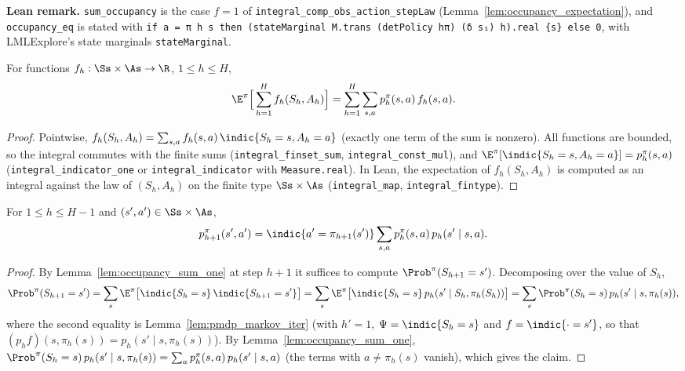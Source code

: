 \textbf{Lean remark.} \texttt{sum\_occupancy} is the case $f = 1$ of
\texttt{integral\_comp\_obs\_action\_stepLaw} (Lemma~\ref{lem:occupancy_expectation}), and
\texttt{occupancy\_eq} is stated with \texttt{if a = π h s then (stateMarginal M.trans (detPolicy hπ) (δ s₁) h).real \{s\} else 0},
with LMLExplore's state marginals \texttt{stateMarginal}.

\begin{lemma}\label{lem:occupancy_expectation}
\leanok
{}
For functions $f_h : \Ss \times \As \to \R$, $1 \le h \le H$,
\[
  \E^\pi\Big[\sum_{h=1}^H f_h(S_h, A_h)\Big] = \sum_{h=1}^H\sum_{s,a} p^\pi_h(s,a)\, f_h(s,a) .
\]
\end{lemma}

\begin{proof}
\leanok
Pointwise, $f_h(S_h, A_h) = \sum_{s,a} f_h(s,a)\,\indic\{S_h = s, A_h = a\}$ (exactly one term
of the sum is nonzero). All functions are bounded, so the integral commutes with the finite
sums (\texttt{integral\_finset\_sum}, \texttt{integral\_const\_mul}), and
$\E^\pi[\indic\{S_h = s, A_h = a\}] = p^\pi_h(s,a)$ (\texttt{integral\_indicator\_one} or
\texttt{integral\_indicator} with \texttt{Measure.real}). In Lean, the expectation of
$f_h(S_h, A_h)$ is computed as an integral against the law of $(S_h, A_h)$ on the finite type
$\Ss \times \As$ (\texttt{integral\_map}, \texttt{integral\_fintype}).
\end{proof}

\begin{lemma}\label{lem:occupancy_recursion}
\leanok
{}
For $1 \le h \le H - 1$ and $(s', a') \in \Ss \times \As$,
\[
  p^\pi_{h+1}(s', a') = \indic\{a' = \pi_{h+1}(s')\}\sum_{s,a} p^\pi_h(s,a)\, p_h(s' \mid s, a) .
\]
\end{lemma}

\begin{proof}
\leanok
By Lemma~\ref{lem:occupancy_sum_one} at step $h + 1$ it suffices to compute
$\Prob^\pi(S_{h+1} = s')$. Decomposing over the value of $S_h$,
\[
  \Prob^\pi(S_{h+1} = s') = \sum_{s}\E^\pi\big[\indic\{S_h = s\}\,\indic\{S_{h+1} = s'\}\big]
  = \sum_{s}\E^\pi\big[\indic\{S_h = s\}\,p_h(s' \mid S_h, \pi_h(S_h))\big]
  = \sum_{s}\Prob^\pi(S_h = s)\,p_h(s' \mid s, \pi_h(s)) ,
\]
where the second equality is Lemma~\ref{lem:pmdp_markov_iter} (with $h' = 1$,
$\Psi = \indic\{S_h = s\}$ and $f = \indic\{\cdot = s'\}$, so that $(p_h f)(s, \pi_h(s)) = p_h(s' \mid s, \pi_h(s))$).
By Lemma~\ref{lem:occupancy_sum_one}, $\Prob^\pi(S_h = s)\,p_h(s'\mid s, \pi_h(s)) = \sum_a p^\pi_h(s,a)\,p_h(s' \mid s, a)$
(the terms with $a \ne \pi_h(s)$ vanish), which gives the claim.
\end{proof}

